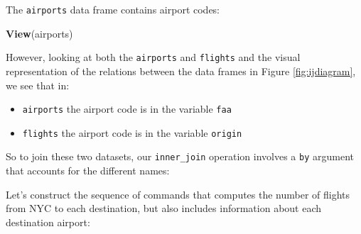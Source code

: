 \documentclass[12pt,]{krantz}
\makeatletter
\newenvironment{Shaded}{\begin{snugshade}}{\end{snugshade}}
\newcommand{\KeywordTok}[1]{\textcolor[rgb]{0.27,0.27,0.27}{\textbf{#1}}}
\newcommand{\DataTypeTok}[1]{\textcolor[rgb]{0.27,0.27,0.27}{#1}}
\newcommand{\StringTok}[1]{\textcolor[rgb]{0.5,0.5,0.5}{#1}}
\newcommand{\OperatorTok}[1]{\textcolor[rgb]{0.43,0.43,0.43}{\textbf{#1}}}
\newcommand{\NormalTok}[1]{#1}
\providecommand{\tightlist}{%
  \setlength{\itemsep}{0pt}\setlength{\parskip}{0pt}}
\newenvironment{kframe}{%
\medskip{}
\setlength{\fboxsep}{.8em}
 \def\at@end@of@kframe{}%
 \ifinner\ifhmode%
  \def\at@end@of@kframe{\end{minipage}}%
  \begin{minipage}{\columnwidth}%
 \fi\fi%
 \def\FrameCommand##1{\hskip\@totalleftmargin \hskip-\fboxsep
 \colorbox{shadecolor}{##1}\hskip-\fboxsep
     \hskip-\linewidth \hskip-\@totalleftmargin \hskip\columnwidth}%
 \MakeFramed {\advance\hsize-\width
   \@totalleftmargin\z@ \linewidth\hsize
   \@setminipage}}%
 {\par\unskip\endMakeFramed%
 \at@end@of@kframe}
\renewenvironment{Shaded}{\begin{kframe}}{\end{kframe}}
\makeatother
\begin{document}
The \texttt{airports} data frame contains airport codes:

\begin{Shaded}
\begin{Highlighting}[]
\KeywordTok{View}\NormalTok{(airports)}
\end{Highlighting}
\end{Shaded}

However, looking at both the \texttt{airports} and \texttt{flights} and
the visual representation of the relations between the data frames in
Figure \ref{fig:ijdiagram}, we see that in:

\begin{itemize}
\tightlist
\item
  \texttt{airports} the airport code is in the variable \texttt{faa}
\item
  \texttt{flights} the airport code is in the variable \texttt{origin}
\end{itemize}

So to join these two datasets, our \texttt{inner\_join} operation
involves a \texttt{by} argument that accounts for the different names:

\begin{Shaded}
\end{Shaded}

Let's construct the sequence of commands that computes the number of
flights from NYC to each destination, but also includes information
about each destination airport:

\begin{Shaded}
\end{Shaded}
\end{document}
